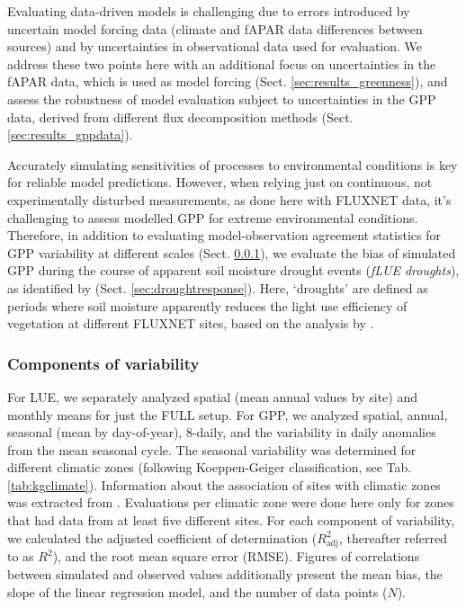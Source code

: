 \documentclass{myreport}
\begin{document}
Evaluating data-driven models is challenging due to errors introduced by uncertain model forcing data \citep{ryu19rse} (climate and fAPAR data differences between sources) and by uncertainties in observational data used for evaluation. We address these two points here with an additional focus on uncertainties in the fAPAR data, which is used as model forcing (Sect. \ref{sec:results_greenness}), and assess the robustness of model evaluation subject to uncertainties in the GPP data, derived from different flux decomposition methods (Sect. \ref{sec:results_gppdata}). 

Accurately simulating sensitivities of processes to environmental conditions is key for reliable model predictions. However, when relying just on continuous, not experimentally disturbed measurements, as done here with FLUXNET data, it's challenging to assess modelled GPP for extreme environmental conditions. Therefore, in addition to evaluating model-observation agreement statistics for GPP variability at different scales (Sect. \ref{sec:evalmethod_variability}), we evaluate the bias of simulated GPP during the course of apparent soil moisture drought events (\textit{fLUE droughts}), as identified by \citet{stocker18newphyt} (Sect. \ref{sec:droughtresponse}). Here, `droughts' are defined as periods where soil moisture apparently reduces the light use efficiency of vegetation at different FLUXNET sites, based on the analysis by \citet{stocker18newphyt}.

\subsubsection{Components of variability}
\label{sec:evalmethod_variability}
For LUE, we separately analyzed spatial (mean annual values by site) and monthly means for just the FULL setup. For GPP, we analyzed spatial, annual, seasonal (mean by day-of-year), 8-daily, and the variability in daily anomalies from the mean seasonal cycle. The seasonal variability was determined for different climatic zones (following Koeppen-Geiger classification, see Tab. \ref{tab:kgclimate}). Information about the association of sites with climatic zones was extracted from \citet{falge17}. Evaluations per climatic zone were done here only for zones that had data from at least five different sites. For each component of variability, we calculated the adjusted coefficient of determination ($R^2_\text{adj}$, thereafter referred to as $R^2$), and the root mean square error (RMSE). Figures of correlations between simulated and observed values additionally present the mean bias, the slope of the linear regression model, and the number of data points ($N$).
\end{document}
